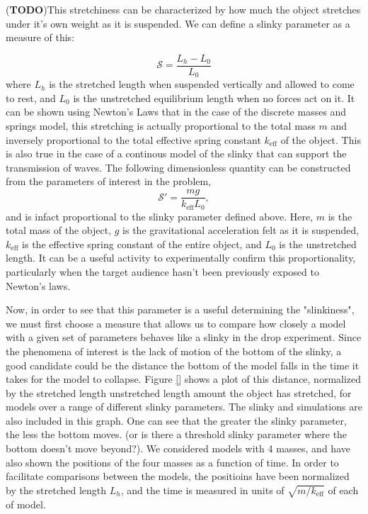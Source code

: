 \documentclass[prb,preprint,superscriptaddress]{revtex4-1}
\newcommand{\TODO}[1]{\marginpar{\raggedright\scriptsize\textbf{TODO:} #1} (\textbf{TODO})}
\begin{document}
\TODO{Motivate this defninition.}This stretchiness can be characterized by how much the object stretches
under it's own weight as it is suspended.   We can define a slinky parameter as a measure of this:

\begin{equation}
\mathcal{S}=\frac{L_h-L_0}{L_0}
\end{equation}
where $L_h$ is the stretched length when suspended vertically and allowed to come to rest, and $L_0$ is the unstretched equilibrium length
when no forces act on it.  It can be shown using Newton's Laws that in the case of the discrete masses and springs model,
this stretching is actually proportional to the total mass $m$ and inversely proportional to the total effective spring constant $k_{\text{eff}}$ of the object.
This is also true in the case of a continous model of the slinky that can support the transmission of waves.  The following dimensionless quantity
can be constructed from the parameters of interest in the problem,
\begin{equation}
\mathcal{S'}=\frac{m g}{k_\text{eff} L_0 },
\end{equation}
 and is infact proportional to the  slinky parameter defined above.  Here, $m$ is the total mass of the object, $g$ is the gravitational acceleration felt as it is suspended, $k_\text{eff}$ is the effective spring constant of the entire object, and $L_0$ is the unstretched length.  It can be a useful activity to experimentally 
confirm this proportionality, particularly when the target audience hasn't been previously exposed to Newton's laws.

Now, in order to see that this parameter is a useful determining the "slinkiness", we must first choose a measure that allows us to compare how closely a model
with a given set of parameters behaves like a slinky in the drop experiment.  Since the phenomena of interest is the lack of motion of the bottom of the slinky, 
a good candidate could be the distance the bottom of the model falls in the time it takes for the model to collapse.  Figure \ref{} shows a plot of this distance, normalized by the stretched length unstretched length amount the object has stretched, for models over a range of different slinky parameters.  The slinky and simulations are also included in this graph.  One can see that the greater the slinky parameter, the less the bottom moves.  (or is there a threshold slinky parameter where  the bottom doesn't move beyond?).  We considered models with 4 masses, and have also shown the positions of the four masses as a function of time.  In order to facilitate comparisons between the models, the positioins have been normalized by the stretched length $L_h$, and the time is measured in units of $\sqrt{m/k_{\text{eff}}}$ of each of model.  
\end{document}
